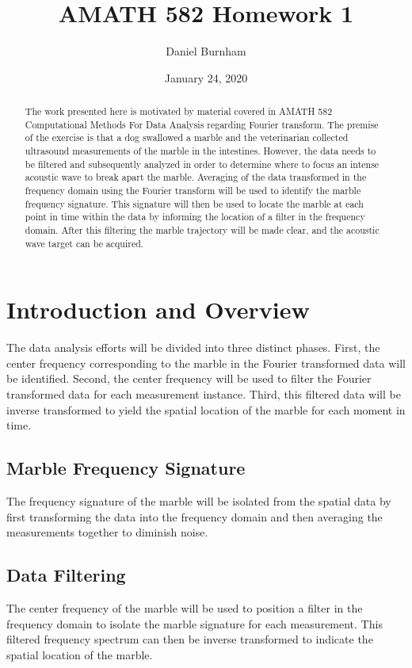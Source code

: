 \documentclass{article}
\title{AMATH 582 Homework 1}
\author{Daniel Burnham}
\date{January 24, 2020}
\begin{document}
\maketitle

\begin{abstract}
The work presented here is motivated by material covered in AMATH 582 Computational Methods For Data Analysis regarding Fourier transform. The premise of the exercise is that a dog swallowed a marble and the veterinarian collected ultrasound measurements of the marble in the intestines. However, the data needs to be filtered and subsequently analyzed in order to determine where to focus an intense acoustic wave to break apart the marble. Averaging of the data transformed in the frequency domain using the Fourier transform will be used to identify the marble frequency signature. This signature will then be used to locate the marble at each point in time within the data by informing the location of a filter in the frequency domain. After this filtering the marble trajectory will be made clear, and the acoustic wave target can be acquired.
\end{abstract}

\section{Introduction and Overview}
The data analysis efforts will be divided into three distinct phases. First, the center frequency corresponding to the marble in the Fourier transformed data will be identified. Second, the center frequency will be used to filter the Fourier transformed data for each measurement instance. Third, this filtered data will be inverse transformed to yield the spatial location of the marble for each moment in time.

\subsection{Marble Frequency Signature}
The frequency signature of the marble will be isolated from the spatial data by first transforming the data into the frequency domain and then averaging the measurements together to diminish noise.

\subsection{Data Filtering}
The center frequency of the marble will be used to position a filter in the frequency domain to isolate the marble signature for each measurement. This filtered frequency spectrum can then be inverse transformed to indicate the spatial location of the marble.
\end{document}
